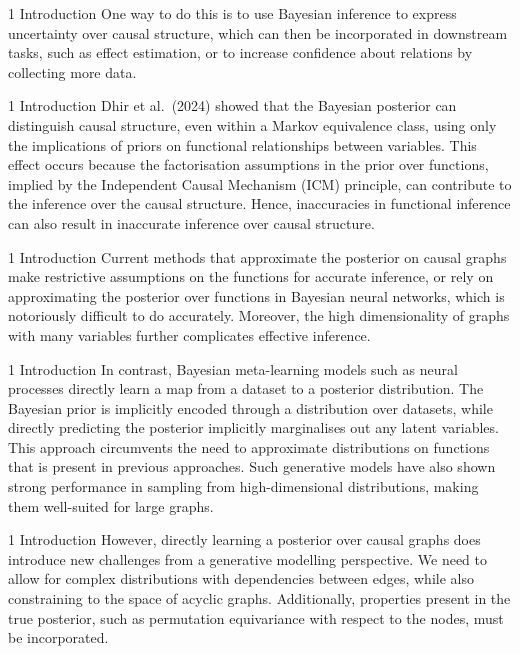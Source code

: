 \documentclass[aspectratio=169,10pt]{beamer}
\begin{document}
\begin{frame}{1 Introduction}
One way to do this is to use Bayesian inference to express uncertainty over causal structure, which can then be incorporated in downstream tasks, such as effect estimation, or to increase confidence about relations by collecting more data.
\end{frame}

\begin{frame}{1 Introduction}
Dhir et al.\ (2024) showed that the Bayesian posterior can distinguish causal structure, even within a Markov equivalence class, using only the implications of priors on functional relationships between variables. This effect occurs because the factorisation assumptions in the prior over functions, implied by the Independent Causal Mechanism (ICM) principle, can contribute to the inference over the causal structure. Hence, inaccuracies in functional inference can also result in inaccurate inference over causal structure.
\end{frame}

\begin{frame}{1 Introduction}
Current methods that approximate the posterior on causal graphs make restrictive assumptions on the functions for accurate inference, or rely on approximating the posterior over functions in Bayesian neural networks, which is notoriously difficult to do accurately. Moreover, the high dimensionality of graphs with many variables further complicates effective inference.
\end{frame}

\begin{frame}{1 Introduction}
In contrast, Bayesian meta-learning models such as neural processes directly learn a map from a dataset to a posterior distribution. The Bayesian prior is implicitly encoded through a distribution over datasets, while directly predicting the posterior implicitly marginalises out any latent variables. This approach circumvents the need to approximate distributions on functions that is present in previous approaches. Such generative models have also shown strong performance in sampling from high-dimensional distributions, making them well-suited for large graphs.
\end{frame}

\begin{frame}{1 Introduction}
However, directly learning a posterior over causal graphs does introduce new challenges from a generative modelling perspective. We need to allow for complex distributions with dependencies between edges, while also constraining to the space of acyclic graphs. Additionally, properties present in the true posterior, such as permutation equivariance with respect to the nodes, must be incorporated.
\end{frame}
\end{document}
